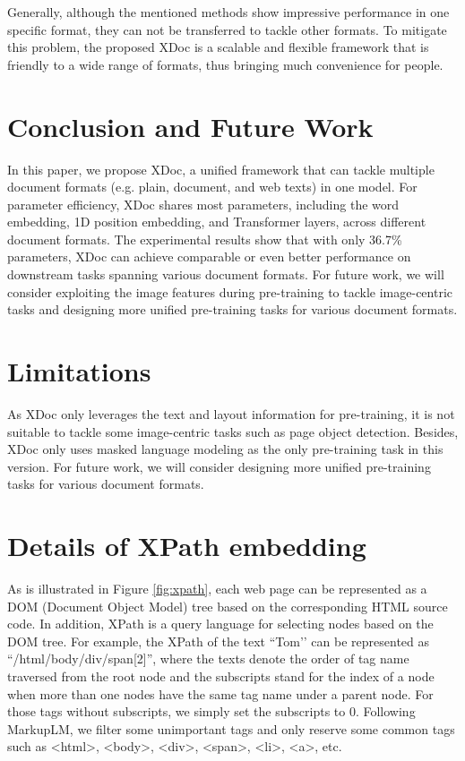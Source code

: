 \documentclass[11pt]{article}
\begin{document}
Generally, although the mentioned methods show impressive performance in one specific format, they can not be transferred to tackle other formats. To mitigate this problem, the proposed XDoc is a scalable and flexible framework that is friendly to a wide range of formats, thus bringing much convenience for people.

\section{Conclusion and Future Work}
In this paper, we propose XDoc, a unified framework that can tackle multiple document formats (e.g. plain, document, and web texts) in one model. For parameter efficiency, XDoc shares most parameters, including the word embedding, 1D position embedding, and Transformer layers, across different document formats. The experimental results show that with only 36.7\% parameters, XDoc can achieve comparable or even better performance on downstream tasks spanning various document formats. For future work, we will consider exploiting the image features during pre-training to tackle image-centric tasks and designing more unified pre-training tasks for various document formats.

\section*{Limitations}
As XDoc only leverages the text and layout information for pre-training, it is not suitable to tackle some image-centric tasks such as page object detection. Besides, XDoc only uses masked language modeling as the only pre-training task in this version. For future work, we will consider designing more unified pre-training tasks for various document formats.




\appendix

\section{Details of XPath embedding}
\label{sec:xpath}



As is illustrated in Figure \ref{fig:xpath}, each web page can be represented as a DOM (Document Object Model) tree based on the corresponding HTML source code. In addition, XPath is a query language for selecting nodes based on the DOM tree. For example, the XPath of the text ``Tom’’ can be represented as “/html/body/div/span[2]”, where the texts denote the order of tag name traversed from the root node and the subscripts stand for the index of a node when more than one nodes have the same tag name under a parent node. For those tags without subscripts, we simply set the subscripts to 0. Following MarkupLM, we filter some unimportant tags and only reserve some common tags such as <html>, <body>, <div>, <span>, <li>, <a>, etc. 
\end{document}
